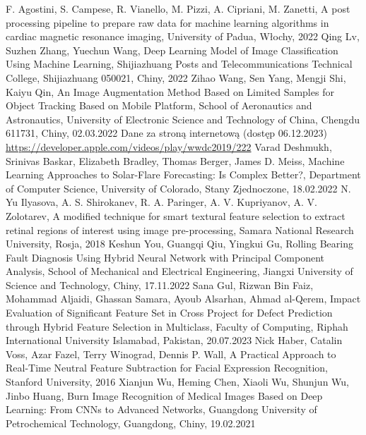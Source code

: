 \documentclass[12pt, a4paper, twoside, openany]{book}
\begin{document}
\begin{thebibliography}{9}
     F. Agostini, S. Campese, R. Vianello, M. Pizzi, A. Cipriani, M. Zanetti, A post processing pipeline to prepare raw data for machine learning algorithms in cardiac magnetic resonance imaging, University of Padua, Włochy, 2022
     Qing Lv, Suzhen Zhang, Yuechun Wang, Deep Learning Model of Image Classification Using Machine Learning, Shijiazhuang Posts and Telecommunications Technical College, Shijiazhuang 050021, Chiny, 2022
     Zihao Wang, Sen Yang, Mengji Shi, Kaiyu Qin, An Image Augmentation Method Based on Limited Samples for Object Tracking Based on Mobile Platform, School of Aeronautics and Astronautics, University of Electronic Science and Technology of China, Chengdu 611731, Chiny, 02.03.2022
     Dane za stroną internetową (dostęp 06.12.2023) \url{https://developer.apple.com/videos/play/wwdc2019/222}
     Varad Deshmukh, Srinivas Baskar, Elizabeth Bradley, Thomas Berger, James D. Meiss, Machine Learning Approaches to Solar-Flare Forecasting: Is Complex Better?, Department of Computer Science, University of Colorado, Stany Zjednoczone, 18.02.2022
     N. Yu Ilyasova, A. S. Shirokanev, R. A. Paringer, A. V. Kupriyanov, A. V. Zolotarev, A modified technique for smart textural feature selection to extract retinal regions of interest using image pre-processing, Samara National Research University, Rosja, 2018
     Keshun You, Guangqi Qiu, Yingkui Gu, Rolling Bearing Fault Diagnosis Using Hybrid Neural Network with Principal Component Analysis, School of Mechanical and Electrical Engineering, Jiangxi University of Science and Technology, Chiny, 17.11.2022
     Sana Gul, Rizwan Bin Faiz, Mohammad Aljaidi, Ghassan Samara, Ayoub Alsarhan, Ahmad al-Qerem, Impact Evaluation of Significant Feature Set in Cross Project for Defect Prediction through Hybrid Feature Selection in Multiclass, Faculty of Computing, Riphah International University Islamabad, Pakistan, 20.07.2023
     Nick Haber, Catalin Voss, Azar Fazel, Terry Winograd, Dennis P. Wall, A Practical Approach to Real-Time Neutral Feature Subtraction for Facial Expression Recognition, Stanford University, 2016
     Xianjun Wu, Heming Chen, Xiaoli Wu, Shunjun Wu, Jinbo Huang, Burn Image Recognition of Medical Images Based on Deep Learning: From CNNs to Advanced Networks, Guangdong University of Petrochemical Technology, Guangdong, Chiny, 19.02.2021

\end{thebibliography}
\end{document}
